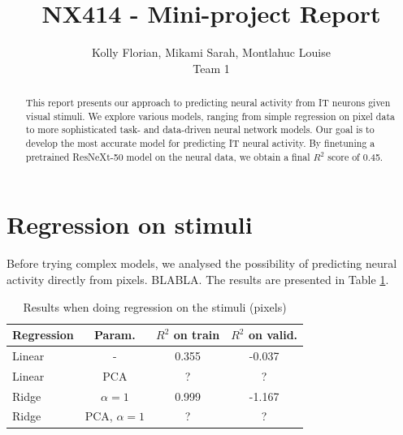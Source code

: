 \documentclass[10pt,conference,compsocconf]{IEEEtran}
\begin{document}
\title{\vspace*{-2em}NX414 - Mini-project Report\vspace*{-1.8em}}

\author{
  Kolly Florian, Mikami Sarah, Montlahuc Louise \\
  Team 1
}

\maketitle

\begin{abstract}
    This report presents our approach to predicting neural activity from IT neurons given visual stimuli. We explore various models, ranging from simple regression on pixel data to more sophisticated task- and data-driven neural network models. Our goal is to develop the most accurate model for predicting IT neural activity. By finetuning a pretrained ResNeXt-50 model on the neural data, we obtain a final \(R^2\) score of 0.45.
\end{abstract}


\section{Regression on stimuli}
Before trying complex models, we analysed the possibility of predicting neural activity directly from pixels. BLABLA. The results are presented in Table \ref{table:regression}.

\begin{table}[h!]
    \centering
    \begin{tabular}{|l|c|c|c|}
        \hline
        Regression & Param. & \(R^2\) on train & \(R^2\) on valid. \\
        \hline
        Linear & - & 0.355 & -0.037 \\
        Linear & PCA & ? & ? \\
        Ridge & \(\alpha=1\) & 0.999 & -1.167 \\
        Ridge & PCA, \(\alpha=1\) & ? & ? \\
        \hline
    \end{tabular}
    \caption{Results when doing regression on the stimuli (pixels)}
    \label{table:regression}
\end{table}
\vspace{-1.5em}
\end{document}

